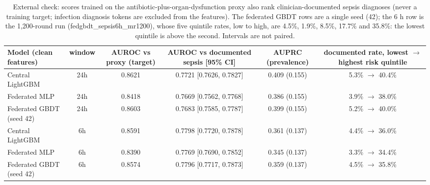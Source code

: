 \begin{table}[t]
\centering\small
\caption{External check: scores trained on the antibiotic-plus-organ-dysfunction proxy also rank clinician-documented sepsis diagnoses (never a training target; infection diagnosis tokens are excluded from the features). The federated GBDT rows are a single seed (42); the 6 h row is the 1,200-round run (fedgbdt\_sepsis6h\_mr1200), whose five quintile rates, low to high, are 4.5\%, 1.9\%, 8.5\%, 17.7\% and 35.8\%: the lowest quintile is above the second. Intervals are not paired.}\label{tab:documented}
\begin{tabular}{lccccc}
\toprule
Model (clean features) & window & AUROC vs proxy (target) & AUROC vs documented sepsis [95\% CI] & AUPRC (prevalence) & documented rate, lowest $\rightarrow$ highest risk quintile \\
\midrule
Central LightGBM & 24h & 0.8621 & 0.7721 [0.7626, 0.7827] & 0.409 (0.155) & 5.3\% $\rightarrow$ 40.4\% \\
Federated MLP & 24h & 0.8418 & 0.7669 [0.7562, 0.7768] & 0.386 (0.155) & 3.9\% $\rightarrow$ 38.0\% \\
Federated GBDT (seed 42) & 24h & 0.8603 & 0.7683 [0.7585, 0.7787] & 0.399 (0.155) & 5.2\% $\rightarrow$ 40.0\% \\
Central LightGBM & 6h & 0.8591 & 0.7798 [0.7720, 0.7878] & 0.361 (0.137) & 4.4\% $\rightarrow$ 36.0\% \\
Federated MLP & 6h & 0.8390 & 0.7769 [0.7690, 0.7852] & 0.345 (0.137) & 3.3\% $\rightarrow$ 34.4\% \\
Federated GBDT (seed 42) & 6h & 0.8574 & 0.7796 [0.7717, 0.7873] & 0.359 (0.137) & 4.5\% $\rightarrow$ 35.8\% \\
\bottomrule
\end{tabular}
\end{table}

